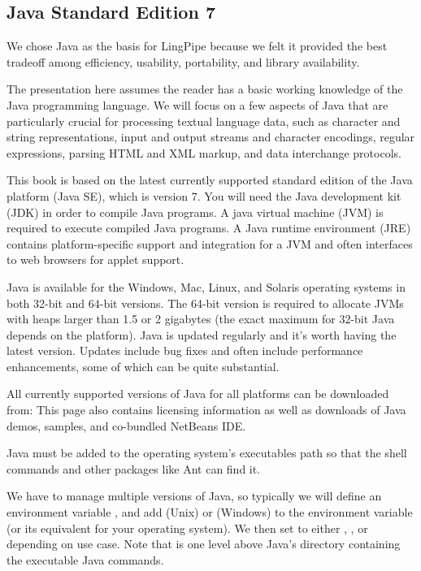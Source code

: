 \subsection{Java Standard Edition 7}

We chose Java as the basis for LingPipe because we felt it
provided the best tradeoff among efficiency, usability, portability,
and library availability.

The presentation here assumes the reader has a basic working knowledge
of the Java programming language.  We will focus on a few aspects of
Java that are particularly crucial for processing textual language
data, such as character and string representations, input and output
streams and character encodings, regular expressions, parsing HTML and
XML markup, and data interchange protocols.

This book is based on the latest currently supported standard edition
of the Java platform (Java SE), which is version 7.  You will need the
Java development kit (JDK) in order to compile Java programs.  A java
virtual machine (JVM) is required to execute compiled Java programs.
A Java runtime environment (JRE) contains platform-specific support
and integration for a JVM and often interfaces to web browsers for
applet support.

Java is available for the Windows, Mac, Linux, and Solaris operating
systems in both 32-bit and 64-bit versions.
The 64-bit version
is required to allocate JVMs with heaps larger than 1.5 or 2 gigabytes
(the exact maximum for 32-bit Java depends on the platform).  
Java is updated regularly and it's worth having the latest version.
Updates include bug fixes and often include performance enhancements,
some of which can be quite substantial.

All currently supported versions of Java for all platforms can be downloaded from:
%
%
This page also contains licensing information as well as downloads of
Java demos, samples, and co-bundled NetBeans IDE.

Java must be added to the operating system's executables path so
that the shell commands and other packages like Ant can find it.

We have to manage multiple versions of Java, so typically we will
define an environment variable , and add
 (Unix) or
 (Windows) to the
 environment variable (or its equivalent for your
operating system).  We then set  to either
, , or 
depending on use case.  Note that  is one level
above Java's  directory containing the executable Java
commands.

